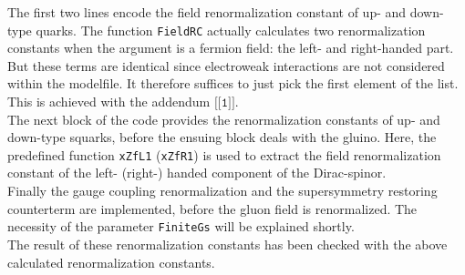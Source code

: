 The first two lines encode the field renormalization constant of up- and down-type quarks. The function \texttt{FieldRC} actually calculates two renormalization constants when the argument is a fermion field: the left- and right-handed part. But these terms are identical since electroweak interactions are not considered within the modelfile. It therefore suffices to just pick the first element of the list. This is achieved with the addendum $\texttt{[[1]]}$.\\
The next block of the code provides the renormalization constants of up- and down-type squarks, before the ensuing block deals with the gluino. Here, the predefined function \texttt{xZfL1} (\texttt{xZfR1}) is used to extract the field renormalization constant of the left- (right-) handed component of the Dirac-spinor.\\
Finally the gauge coupling renormalization and the supersymmetry restoring counterterm are implemented, before the gluon field is renormalized. The necessity of the parameter \texttt{FiniteGs} will be explained shortly.\\
The result of these renormalization constants has been checked with the above calculated renormalization constants.

